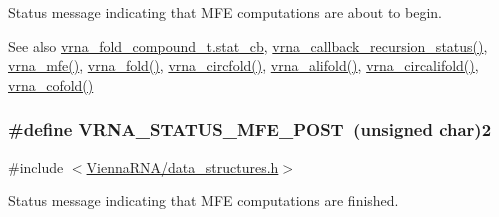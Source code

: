 Status message indicating that M\+F\+E computations are about to begin. 

\begin{DoxySeeAlso}{See also}
\hyperlink{group__fold__compound_a87a83f6795b569000efcbe65acc3dd81}{vrna\+\_\+fold\+\_\+compound\+\_\+t.\+stat\+\_\+cb}, \hyperlink{group__fold__compound_ga4a4a0d838de6d18315bafc84f93f5cc0}{vrna\+\_\+callback\+\_\+recursion\+\_\+status()}, \hyperlink{group__mfe__fold_gabd3b147371ccf25c577f88bbbaf159fd}{vrna\+\_\+mfe()}, \hyperlink{group__mfe__fold__single_gae7ca49ffb3086f145da36c964a7cec64}{vrna\+\_\+fold()}, \hyperlink{group__mfe__fold__single_gaa0f5bf321038f404b36a6147bdae4154}{vrna\+\_\+circfold()}, \hyperlink{group__consensus__mfe__fold_ga02098d0c8790f9a37fbef6ad0cfc705c}{vrna\+\_\+alifold()}, \hyperlink{group__consensus__mfe__fold_ga01ce2cff93ea44c4f4254760ca2bd16c}{vrna\+\_\+circalifold()}, \hyperlink{group__mfe__cofold_ga45515db181f17653ef7ef5487ef36d08}{vrna\+\_\+cofold()} 
\end{DoxySeeAlso}
\hypertarget{group__fold__compound_ga47c900ca76e56e59e2e83a06e0bde641}{}
\subsubsection[{V\+R\+N\+A\+\_\+\+S\+T\+A\+T\+U\+S\+\_\+\+M\+F\+E\+\_\+\+P\+O\+S\+T}]{\setlength{\rightskip}{0pt plus 5cm}\#define V\+R\+N\+A\+\_\+\+S\+T\+A\+T\+U\+S\+\_\+\+M\+F\+E\+\_\+\+P\+O\+S\+T~(unsigned char)2}\label{group__fold__compound_ga47c900ca76e56e59e2e83a06e0bde641}


{\ttfamily \#include $<$\hyperlink{data__structures_8h}{Vienna\+R\+N\+A/data\+\_\+structures.\+h}$>$}



Status message indicating that M\+F\+E computations are finished. 

